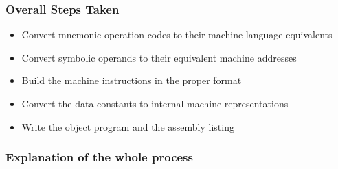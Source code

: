 \documentclass[12pt]{article}
\begin{document}
\subsubsection{Overall Steps Taken}
\begin{itemize}
    \item  Convert mnemonic operation codes to their machine language equivalents
  \item   Convert symbolic operands to their equivalent machine addresses
    \item Build the machine instructions in the proper format
    \item Convert the data constants to internal machine representations
    \item Write the object program and the assembly listing\end{itemize}
\hypertarget{link_algo}{\subsubsection{ Explanation of the whole process}}
\end{document}
